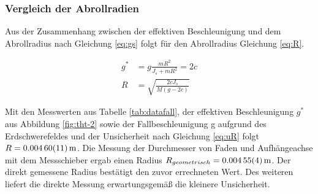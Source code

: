 \subsubsection{Vergleich der Abrollradien}


Aus der Zusammenhang zwischen der effektiven Beschleunigung und  dem Abrollradius nach Gleichung \ref{eq:gs} folgt für den Abrollradius Gleichung \ref{eq:R}.

\begin{align}
g^*  &= g \frac{mR^2}{J_s + m R^2}= 2c \label{eq:gs}\\
R&=\sqrt{\frac{2 c J_s}{M (g-2c)}} \label{eq:R}
\end{align}

Mit den Messwerten aus Tabelle \ref{tab:datafall}, der effektiven Beschleunigung $g^*$ aus Abbildung \ref{fig:tht-2} sowie der Fallbeschleunigung g aufgrund des Erdschwerefeldes und der Unsicherheit nach Gleichung \ref{eq:uR} folgt $R=\SI{0.00460\pm 0.00011}{m}$. Die Messung der Durchmesser von Faden und Aufhängeachse mit dem Messschieber ergab einen Radius $R_{geometrisch}=\SI{0.00455 \pm 0.00004}{m}$. Der direkt gemessene Radius bestätigt den zuvor errechneten Wert. Des weiteren liefert die direkte Messung erwartungsgemäß die kleinere Unsicherheit.  